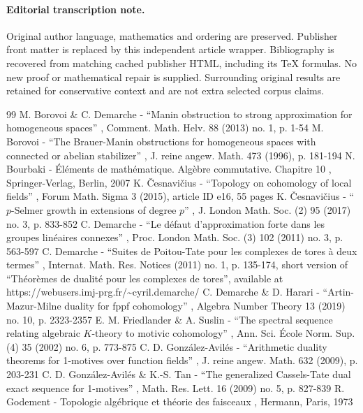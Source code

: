 \documentclass[11pt]{article}
\begin{document}
\paragraph{Editorial transcription note.}
Original author language, mathematics and ordering are preserved. Publisher front matter is replaced by this independent article wrapper. Bibliography is recovered from matching cached publisher HTML, including its TeX formulas. No new proof or mathematical repair is supplied. Surrounding original results are retained for conservative context and are not extra selected corpus claims.
\clearpage

\begin{thebibliography}{99}
 M. Borovoi \& C. Demarche - “Manin obstruction to strong approximation for homogeneous spaces” , Comment. Math. Helv. 88 (2013) no. 1, p. 1-54
 M. Borovoi - “The Brauer-Manin obstructions for homogeneous spaces with connected or abelian stabilizer” , J. reine angew. Math. 473 (1996), p. 181-194
 N. Bourbaki - Éléments de mathématique. Algèbre commutative. Chapitre 10 , Springer-Verlag, Berlin, 2007
 K. Česnavičius - “Topology on cohomology of local fields” , Forum Math. Sigma 3 (2015), article ID e16, 55 pages
 K. Česnavičius - “$p$-Selmer growth in extensions of degree $p$” , J. London Math. Soc. (2) 95 (2017) no. 3, p. 833-852
 C. Demarche - “Le défaut d’approximation forte dans les groupes linéaires connexes” , Proc. London Math. Soc. (3) 102 (2011) no. 3, p. 563-597
 C. Demarche - “Suites de Poitou-Tate pour les complexes de tores à deux termes” , Internat. Math. Res. Notices (2011) no. 1, p. 135-174, short version of “Théorèmes de dualité pour les complexes de tores”, available at https://webusers.imj-prg.fr/\textasciitilde{}cyril.demarche/
 C. Demarche \& D. Harari - “Artin-Mazur-Milne duality for fppf cohomology” , Algebra Number Theory 13 (2019) no. 10, p. 2323-2357
 E. M. Friedlander \& A. Suslin - “The spectral sequence relating algebraic $K$-theory to motivic cohomology” , Ann. Sci. École Norm. Sup. (4) 35 (2002) no. 6, p. 773-875
 C. D. González-Avilés - “Arithmetic duality theorems for 1-motives over function fields” , J. reine angew. Math. 632 (2009), p. 203-231
 C. D. González-Avilés \& K.-S. Tan - “The generalized Cassels-Tate dual exact sequence for 1-motives” , Math. Res. Lett. 16 (2009) no. 5, p. 827-839
 R. Godement - Topologie algébrique et théorie des faisceaux , Hermann, Paris, 1973

\end{thebibliography}
\end{document}
